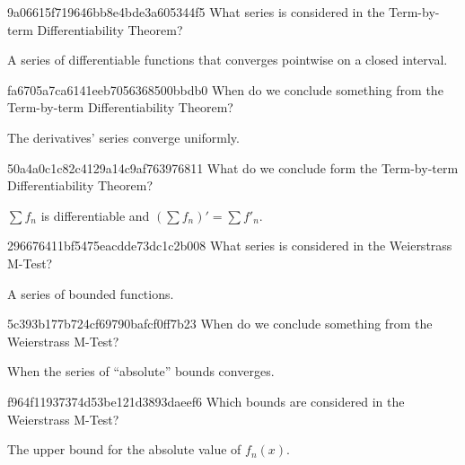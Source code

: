 \begin{note}{9a06615f719646bb8e4bde3a605344f5}
    What series is considered in the Term-by-term Differentiability Theorem?

    \begin{cloze}{1}
        A series of differentiable functions that converges pointwise on a closed interval.
    \end{cloze}
\end{note}

\begin{note}{fa6705a7ca6141eeb7056368500bbdb0}
    When do we conclude something from the Term-by-term Differentiability Theorem?

    \begin{cloze}{1}
        The derivatives' series converge uniformly.
    \end{cloze}
\end{note}

\begin{note}{50a4a0c1c82c4129a14c9af763976811}
    What do we conclude form the Term-by-term Differentiability Theorem?

    \begin{cloze}{1}
        \({ \sum f_n }\) is differentiable and \({ \left( \sum f_n \right)' = \sum f'_n }\).
    \end{cloze}
\end{note}

\begin{note}{296676411bf5475eacdde73dc1c2b008}
    What series is considered in the Weierstrass M-Test?

    \begin{cloze}{1}
        A series of bounded functions.
    \end{cloze}
\end{note}

\begin{note}{5c393b177b724cf69790bafcf0ff7b23}
    When do we conclude something from the Weierstrass M-Test?

    \begin{cloze}{1}
        When the series of ``absolute'' bounds converges.
    \end{cloze}
\end{note}

\begin{note}{f964f11937374d53be121d3893daeef6}
    Which bounds are considered in the Weierstrass M-Test?

    \begin{cloze}{1}
        The upper bound for the absolute value of \({ f_n(x) }\).
    \end{cloze}
\end{note}

